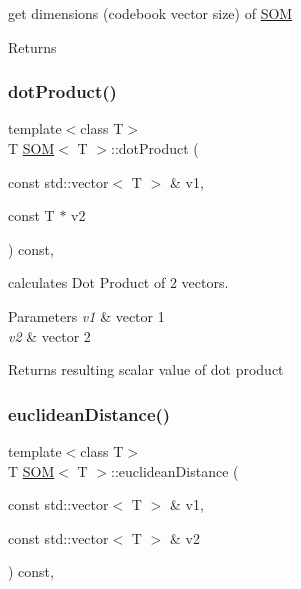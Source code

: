 get dimensions (codebook vector size) of \mbox{\hyperlink{class_s_o_m}{S\+OM}} 

\begin{DoxyReturn}{Returns}

\end{DoxyReturn}
\mbox{\label{class_s_o_m_aae16d4dfa51332b631c314dc82ef9145}} 
\subsubsection{\texorpdfstring{dot\+Product()}{dotProduct()}}
{\footnotesize\ttfamily template$<$class T$>$ \\
T \mbox{\hyperlink{class_s_o_m}{S\+OM}}$<$ T $>$\+::dot\+Product (\begin{DoxyParamCaption}\item[{const std\+::vector$<$ T $>$ \&}]{v1,  }\item[{const T $\ast$}]{v2 }\end{DoxyParamCaption}) const\hspace{0.3cm}{\ttfamily [inline]}, {\ttfamily [private]}}



calculates Dot Product of 2 vectors. 


\begin{DoxyParams}{Parameters}
{\em v1} & vector 1\\
\hline
{\em v2} & vector 2\\
\hline
\end{DoxyParams}
\begin{DoxyReturn}{Returns}
resulting scalar value of dot product 
\end{DoxyReturn}
\mbox{\label{class_s_o_m_a81a8ee36536002796b31d03f9a67ded1}} 
\subsubsection{\texorpdfstring{euclidean\+Distance()}{euclideanDistance()}\hspace{0.1cm}{\footnotesize\ttfamily [1/2]}}
{\footnotesize\ttfamily template$<$class T$>$ \\
T \mbox{\hyperlink{class_s_o_m}{S\+OM}}$<$ T $>$\+::euclidean\+Distance (\begin{DoxyParamCaption}\item[{const std\+::vector$<$ T $>$ \&}]{v1,  }\item[{const std\+::vector$<$ T $>$ \&}]{v2 }\end{DoxyParamCaption}) const\hspace{0.3cm}{\ttfamily [inline]}, {\ttfamily [private]}}



